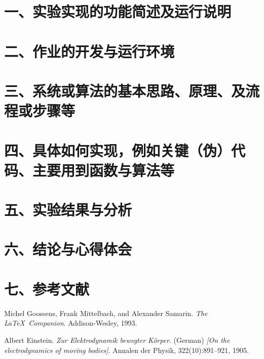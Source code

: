 \documentclass{CVrep}
\begin{document}
\maketitle

\section*{一、实验实现的功能简述及运行说明}

\section*{二、作业的开发与运行环境}

\section*{三、系统或算法的基本思路、原理、及流程或步骤等}

\section*{四、具体如何实现，例如关键（伪）代码、主要用到函数与算法等}

\section*{五、实验结果与分析}

\section*{六、结论与心得体会}

\section*{七、参考文献}
\begin{thebibliography}{9}
  Michel Goossens, Frank Mittelbach, and Alexander Samarin. 
  \textit{The \LaTeX\ Companion}. 
  Addison-Wesley, 1993.

  Albert Einstein. 
  \textit{Zur Elektrodynamik bewegter K{\"o}rper}. (German) \textit{[On the electrodynamics of moving bodies]}. 
  Annalen der Physik, 322(10):891–921, 1905.

\end{thebibliography}

\appendix
\end{document}
